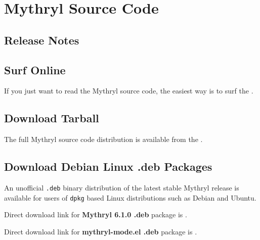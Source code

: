 \chapter{Mythryl Source Code}

%
%

\section{Release Notes}


\cutend*

\section{Surf Online}

If you just want to read the Mythryl source code, the easiest way is to surf 
the .

\section{Download Tarball}

The full Mythryl source code distribution is available from the .

\section{Download Debian Linux .deb Packages}

An unofficial {\tt .deb} binary distribution of the latest stable Mythryl release 
is available  for users of {\tt dpkg} based Linux 
distributions such as Debian and Ubuntu.

Direct download link for \textbf{Mythryl 6.1.0 .deb} package is .

Direct download link for \textbf{mythryl-mode.el .deb} package is .

